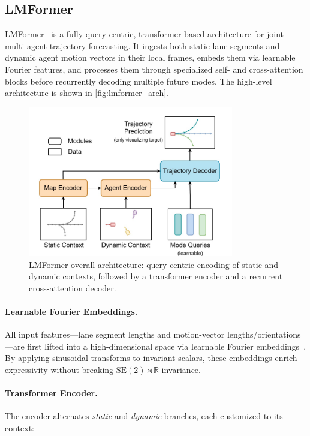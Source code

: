 \subsection{LMFormer}
\label{ssec:lmformer}

LMFormer~\cite{lmformerYadav2025} is a fully query-centric, transformer-based architecture for joint multi-agent trajectory forecasting. It ingests both static lane segments and dynamic agent motion vectors in their local frames, embeds them via learnable Fourier features, and processes them through specialized self- and cross-attention blocks before recurrently decoding multiple future modes. The high-level architecture is shown in \autoref{fig:lmformer_arch}.

\begin{figure}[ht]
  \centering
  \includegraphics[width=0.8\textwidth]{figures/lmformer_arch.png}
  \caption{LMFormer overall architecture: query-centric encoding of static and dynamic contexts, followed by a transformer encoder and a recurrent cross-attention decoder.}
  \label{fig:lmformer_arch}
\end{figure}

\paragraph{Learnable Fourier Embeddings.}
All input features—lane segment lengths and motion-vector lengths/orientations—are first lifted into a high-dimensional space via learnable Fourier embeddings~\cite{li2021llearnableFourier}. By applying sinusoidal transforms to invariant scalars, these embeddings enrich expressivity without breaking \(\mathrm{SE}(2)\!\rtimes\!\mathbb{R}\) invariance.

\paragraph{Transformer Encoder.}
The encoder alternates \emph{static} and \emph{dynamic} branches, each customized to its context:

